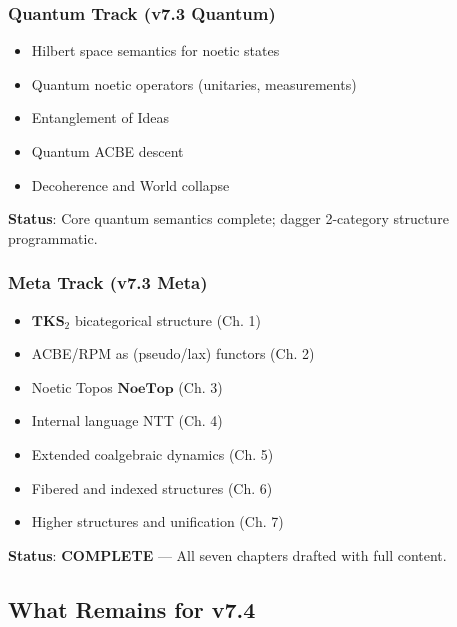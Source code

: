 \subsubsection{Quantum Track (v7.3 Quantum)}
\begin{itemize}
  \item Hilbert space semantics for noetic states
  \item Quantum noetic operators (unitaries, measurements)
  \item Entanglement of Ideas
  \item Quantum ACBE descent
  \item Decoherence and World collapse
\end{itemize}
\textbf{Status}: Core quantum semantics complete; dagger 2-category structure programmatic.

\subsubsection{Meta Track (v7.3 Meta)}
\begin{itemize}
  \item $\mathbf{TKS}_2$ bicategorical structure (Ch. 1)
  \item ACBE/RPM as (pseudo/lax) functors (Ch. 2)
  \item Noetic Topos $\mathbf{NoeTop}$ (Ch. 3)
  \item Internal language NTT (Ch. 4)
  \item Extended coalgebraic dynamics (Ch. 5)
  \item Fibered and indexed structures (Ch. 6)
  \item Higher structures and unification (Ch. 7)
\end{itemize}
\textbf{Status}: \textbf{COMPLETE} --- All seven chapters drafted with full content.

\subsection{What Remains for v7.4}
\label{subsec:v74-remaining}

